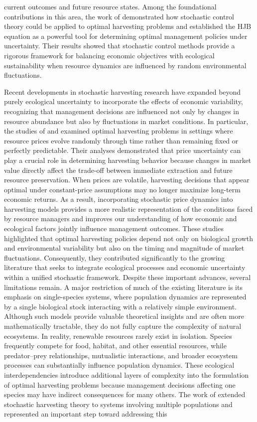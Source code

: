 \documentclass[11pt]{article}
\begin{document}
current outcomes and future resource states. Among the foundational contributions in this area, the work of \cite{lungu_oksendal_2001} demonstrated how stochastic control theory could be applied to optimal harvesting problems and established the HJB equation as a powerful tool for determining optimal management policies under uncertainty. Their results showed that stochastic control methods provide a rigorous framework for balancing economic objectives with ecological sustainability when resource dynamics are influenced by random environmental fluctuations.
	
	Recent developments in stochastic harvesting research have expanded beyond purely ecological uncertainty to incorporate the effects of economic variability, recognizing that management decisions are influenced not only by changes in resource abundance but also by fluctuations in market conditions. In particular, the studies of \cite{brites_braumann_2023} and \cite{hening_tran_2020} examined optimal harvesting problems in settings where resource prices evolve randomly through time rather than remaining fixed or perfectly predictable. Their analyses demonstrated that price uncertainty can play a crucial role in determining harvesting behavior because changes in market value directly affect the trade-off between immediate extraction and future resource preservation. When prices are volatile, harvesting decisions that appear optimal under constant-price assumptions may no longer maximize long-term economic returns. As a result, incorporating stochastic price dynamics into harvesting models provides a more realistic representation of the conditions faced by resource managers and improves our understanding of how economic and ecological factors jointly influence management outcomes. These studies highlighted that optimal harvesting policies depend not only on biological growth and environmental variability but also on the timing and magnitude of market fluctuations. Consequently, they contributed significantly to the growing literature that seeks to integrate ecological processes and economic uncertainty within a unified stochastic framework. Despite these important advances, several limitations remain. A major restriction of much of the existing literature is its emphasis on single-species systems, where population dynamics are represented by a single biological stock interacting with a relatively simple environment. Although such models provide valuable theoretical insights and are often more mathematically tractable, they do not fully capture the complexity of natural ecosystems. In reality, renewable resources rarely exist in isolation. Species frequently compete for food, habitat, and other essential resources, while predator--prey relationships, mutualistic interactions, and broader ecosystem processes can substantially influence population dynamics. These ecological interdependencies introduce additional layers of complexity into the formulation of optimal harvesting problems because management decisions affecting one species may have indirect consequences for many others. The work of \cite{lungu_oksendal_2001} extended stochastic harvesting theory to systems involving multiple populations and represented an important step toward addressing this 
\end{document}
